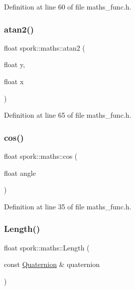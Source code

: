 Definition at line 60 of file maths\+\_\+func.\+h.

\mbox{\label{namespacespork_1_1maths_afde139a899ca339b136632896e02c499}} 
\subsubsection{\texorpdfstring{atan2()}{atan2()}}
{\footnotesize\ttfamily float spork\+::maths\+::atan2 (\begin{DoxyParamCaption}\item[{float}]{y,  }\item[{float}]{x }\end{DoxyParamCaption})\hspace{0.3cm}{\ttfamily [inline]}}



Definition at line 65 of file maths\+\_\+func.\+h.

\mbox{\label{namespacespork_1_1maths_a65b5ef1857a065cbab527d0fa4cd92df}} 
\subsubsection{\texorpdfstring{cos()}{cos()}}
{\footnotesize\ttfamily float spork\+::maths\+::cos (\begin{DoxyParamCaption}\item[{float}]{angle }\end{DoxyParamCaption})\hspace{0.3cm}{\ttfamily [inline]}}



Definition at line 35 of file maths\+\_\+func.\+h.

\mbox{\label{namespacespork_1_1maths_a7accffaa77c9ecaba22d3c5784fd550b}} 
\subsubsection{\texorpdfstring{Length()}{Length()}}
{\footnotesize\ttfamily float spork\+::maths\+::\+Length (\begin{DoxyParamCaption}\item[{const \hyperlink{structspork_1_1maths_1_1_quaternion}{Quaternion} \&}]{quaternion }\end{DoxyParamCaption})}




